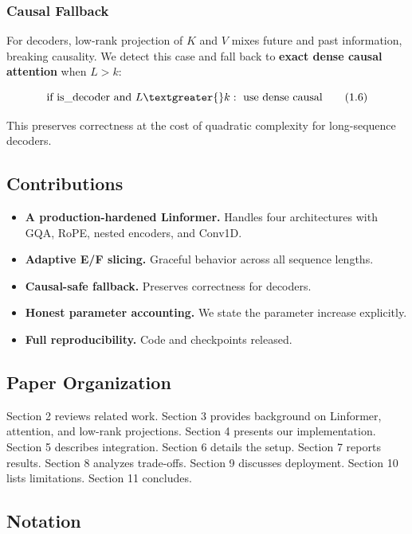 \subsubsection{Causal Fallback}

For decoders, low-rank projection of $K$ and $V$ mixes future and past 
information, breaking causality. We detect this case and fall back to 
\textbf{exact dense causal attention} when $L > k$:

\[
\text{if } \text{is\_decoder} \text{ and } L \textgreater{} k: \text{ use dense causal}
\tag{1.6}
\]

This preserves correctness at the cost of quadratic complexity for 
long-sequence decoders.

\subsection{Contributions}

\begin{itemize}
\item \textbf{A production-hardened Linformer.} Handles four architectures with
  GQA, RoPE, nested encoders, and Conv1D.
\item \textbf{Adaptive E/F slicing.} Graceful behavior across all sequence lengths.
\item \textbf{Causal-safe fallback.} Preserves correctness for decoders.
\item \textbf{Honest parameter accounting.} We state the parameter increase
  explicitly.
\item \textbf{Full reproducibility.} Code and checkpoints released.

\end{itemize}
\subsection{Paper Organization}

Section 2 reviews related work. Section 3 provides background on Linformer, 
attention, and low-rank projections. Section 4 presents our implementation. 
Section 5 describes integration. Section 6 details the setup. Section 7 
reports results. Section 8 analyzes trade-offs. Section 9 discusses 
deployment. Section 10 lists limitations. Section 11 concludes.



\subsection{Notation}

